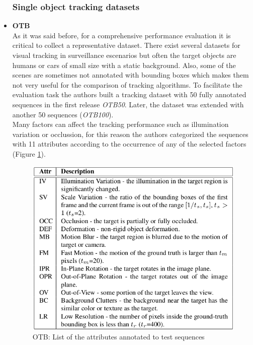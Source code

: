 \begin{itemize}
\subsubsection{Single object tracking datasets}
\item \textbf{OTB} ~\cite{wu2013online}\\
As it was said before, for a comprehensive performance evaluation it is critical to collect a representative dataset. There exist several datasets for visual tracking in surveillance escenarios but often the target objects are humans or cars of small size with a static background. Also, some of the scenes are sometimes not annotated with bounding boxes which makes them not very useful for the comparison of tracking algorithms. To facilitate the evaluation task the authors built a tracking dataset with 50 fully annotated sequences in the first release \textit{OTB50}. Later, the dataset was extended with another 50 sequences (\textit{OTB100}).\\ Many factors can affect the tracking performance such as illumination variation or occlussion, for this reason the authors categorized the sequences with 11 attributes according to the occurrence of any of the selected factors (Figure \ref{fig:otb}).\\
\begin{figure}[H]
\begin{center}
\includegraphics[scale=0.3]{otb_attributes.png}
\caption{OTB: List of the attributes annotated to test sequences ~\cite{wu2013online}}
\label{fig:otb}
\end{center}

\end{figure}
\end{itemize}
